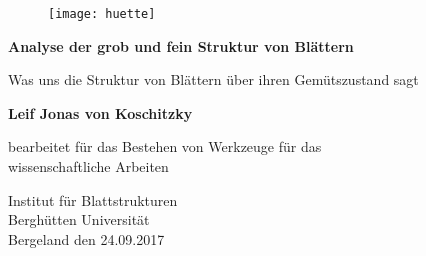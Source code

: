 \begin{titlepage}
    \begin{center}
        

\begin{figure}[h]
    \centering
    \texttt{[image: huette]}
\end{figure}
        
        \huge
        \textbf{Analyse der grob und fein Struktur von Blättern}
        
        \LARGE
        \vspace{.5cm}
        Was uns die Struktur von Blättern über ihren Gemütszustand sagt
        
        \vspace{1.0cm}
        
        \textbf{Leif Jonas von Koschitzky}
        
        \vfill
        \large
        bearbeitet f\"ur das Bestehen von Werkzeuge f\"ur das\\
        wissenschaftliche Arbeiten
        
        \vspace{0.8cm}
        

        \LARGE
        Institut f\"ur Blattstrukturen\\
        Bergh\"utten Universit\"at\\
        Bergeland den 24.09.2017\\
        
        
    \end{center}
\end{titlepage}